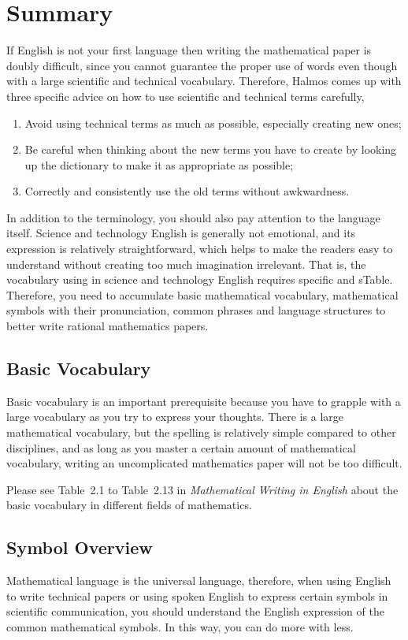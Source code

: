 \section{Summary}
If English is not your first language then writing the mathematical paper is doubly difficult, since you cannot guarantee the proper use of words even though with a large scientific and technical vocabulary. Therefore, Halmos comes up with three specific advice on how to use scientific and technical terms carefully,
\begin{enumerate}[label={\Alph*.}]
	\item Avoid using technical terms as much as possible, especially creating new ones;
	\item Be careful when thinking about the new terms you have to create by looking up the dictionary to make it as appropriate as possible;
	\item Correctly and consistently use the old terms without awkwardness.
\end{enumerate}

In addition to the terminology, you should also pay attention to the language itself. Science and technology English is generally not emotional, and its expression is relatively straightforward, which helps to make the readers easy to understand without creating too much imagination irrelevant. That is, the vocabulary using in science and technology English requires specific and sTable. Therefore, you need to accumulate basic mathematical vocabulary, mathematical symbols with their pronunciation, common phrases and language structures to better write rational mathematics papers.


\subsection{Basic Vocabulary}
Basic vocabulary is an important prerequisite because you have to grapple with a large vocabulary as you try to express your thoughts. There is a large mathematical vocabulary, but the spelling is relatively simple compared to other disciplines, and as long as you master a certain amount of mathematical vocabulary, writing an uncomplicated mathematics paper will not be too difficult.

Please see Table~2.1 to Table~2.13 in \emph{Mathematical Writing in English}\cite{2013数学之英文写作} about the basic vocabulary in different fields of mathematics.


\subsection{Symbol Overview}
Mathematical language is the universal language, therefore, when using English to write technical papers or using spoken English to express certain symbols in scientific communication, you should understand the English expression of the common mathematical symbols. In this way, you can do more with less.

